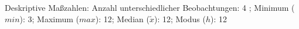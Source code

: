 				\label{tableValues:cend13_g2}
				\vspace*{-\baselineskip}
                    \begin{noten}
                	    \note{} Deskriptive Maßzahlen:
                	    Anzahl unterschiedlicher Beobachtungen: 4%
                	    ; 
                	      Minimum ($min$): 3; 
                	      Maximum ($max$): 12; 
                	      Median ($\tilde{x}$): 12; 
                	      Modus ($h$): 12
                     \end{noten}


